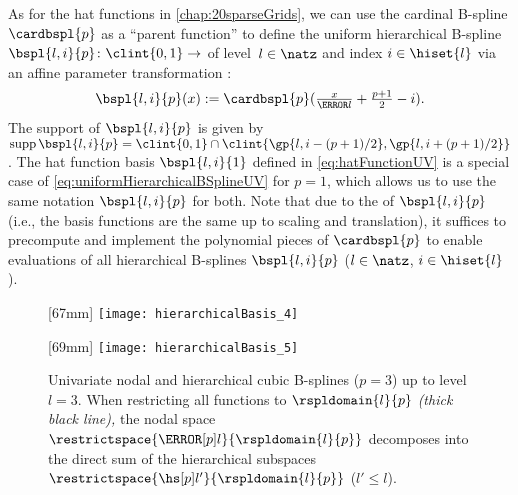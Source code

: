 As for the hat functions in \cref{chap:20sparseGrids},
we can use the cardinal B-spline $\cardbspl{p}$ as a ``parent function'' to
define the uniform hierarchical B-spline
$\bspl{l,i}{p}\colon \clint{0, 1} \to \real$ of level~$l \in \natz$ and index
$i \in \hiset{l}$ via an affine parameter transformation
\cite{Pflueger10Spatially}:
\begin{equation}
  \label{eq:uniformHierarchicalBSplineUV}
  \bspl{l,i}{p}(x)
  := \cardbspl{p}(\tfrac{x}{\ms{l}} + \tfrac{p+1}{2} - i).
\end{equation}
The support of $\bspl{l,i}{p}$ is given
by $\supp \bspl{l,i}{p} = \clint{0, 1} \cap \clint{\gp{l,i-(p+1)/2}, \gp{l,i+(p+1)/2}}$.
The hat function basis $\bspl{l,i}{1}$ defined in
\eqref{eq:hatFunctionUV} is a special case of
\eqref{eq:uniformHierarchicalBSplineUV} for $p = 1$,
which allows us to use the same notation $\bspl{l,i}{p}$ for both.
Note that due to the  of $\bspl{l,i}{p}$
(i.e., the basis functions are the same up to scaling and translation),
it suffices to precompute and implement the polynomial pieces of $\cardbspl{p}$
to enable evaluations of all hierarchical B-splines
$\bspl{l,i}{p}$ ($l \in \natz$, $i \in \hiset{l}$).

\begin{figure}
  [67mm]{%
    \texttt{[image: hierarchicalBasis\_4]}%
  }%
  \hfill%
  \hfill%
  [69mm]{%
    \texttt{[image: hierarchicalBasis\_5]}%
  }%
  \caption[%
    Nodal and hierarchical B-splines%
  ]{%
    Univariate nodal and hierarchical cubic B-splines ($p = 3$)
    \vspace{0.1em}%
    up to level $l = 3$.
    When restricting all functions to $\rspldomain{l}{p}$
    \emph{(thick black line),}
    \vspace{-0.2em}%
    the nodal space $\restrictspace{\nsbspl{l}{p}}{\rspldomain{l}{p}}$
    decomposes into the direct sum of the hierarchical subspaces
    $\restrictspace{\hsbspl{l'}{p}}{\rspldomain{l}{p}}$ ($l' \le l$).%
  }%
  \label{fig:hierarchicalBSpline}%
\end{figure}

